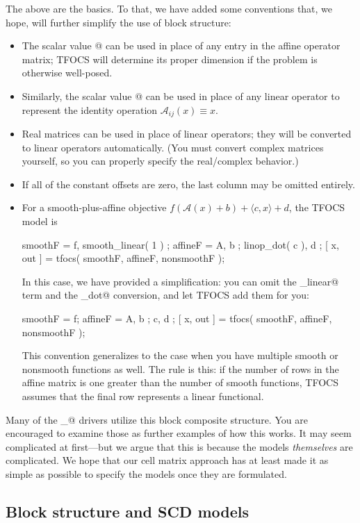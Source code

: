 \documentclass{article}
\newcommand{\cA}{\ensuremath{\mathcal{A}}}    %
\newcommand{\<}{\langle}
\renewcommand{\>}{\rangle}
\begin{document}
The above are the basics. To that, we have added some conventions that,
we hope, will further simplify the use of block structure:
\begin{itemize}
\item The scalar value @ can be used in place of any entry in
the affine operator matrix; TFOCS will determine its proper dimension
if the problem is otherwise well-posed.
\item Similarly, the scalar value @ can be used in place of
any linear operator to represent the identity operation $\cA_{ij}(x)\equiv x$.
\item Real matrices can be used in place of linear operators; they will
be converted to linear operators automatically. (You must convert complex
matrices yourself, so you can properly specify the real/complex behavior.)
\item If all of the constant offsets are zero, the last column may be omitted entirely.
\item For a smooth-plus-affine objective
$f(\cA(x)+b)+\<c,x\>+d$, the TFOCS model is
\begin{code}
	smoothF = { f, smooth_linear( 1 ) };
	affineF = { A, b ; linop_dot( c ), d };
	[ x, out ] = tfocs( smoothF, affineF, nonsmoothF );
\end{code}
In this case, we have provided a simplification: you can omit the
\verb@smooth_linear@ term and the \verb@linop_dot@ conversion, and let
TFOCS add them for you:
\begin{code}
	smoothF = f;
	affineF = { A, b ; c, d };
	[ x, out ] = tfocs( smoothF, affineF, nonsmoothF );
\end{code}
This convention generalizes to the case when you have multiple 
smooth or nonsmooth functions as well.
The rule is this: if the number of rows in the affine matrix is
one greater than the number of smooth functions,
TFOCS assumes that the final row represents a linear functional.
\end{itemize}

Many of the \verb@solver_@ drivers utilize this block composite
structure. You are encouraged to examine those as further examples
of how this works. It may seem complicated at first---but we argue
that this is because the models \emph{themselves} are complicated.
We hope that our cell matrix approach has at least made it as simple
as possible to specify the models once they are formulated.

\subsection{Block structure and SCD models}
\label{sec:SCD}
\end{document}
